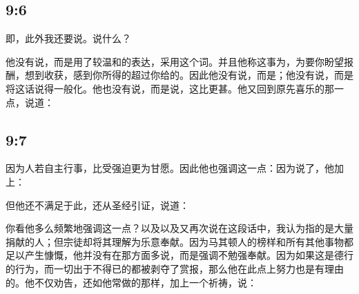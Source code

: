 
\subsection{ 9:6}

即，此外我还要说。说什么？\par

他没有说，而是用了较温和的表达，采用这个词。并且他称这事为，为要你盼望报酬，想到收获，感到你所得的超过你给的。因此他没有说，而是；他没有说，而是将这话说得一般化。他也没有说，而是说，这比更甚。他又回到原先喜乐的那一点，说道：\par


\subsection{ 9:7}

因为人若自主行事，比受强迫更为甘愿。因此他也强调这一点：因为说了，他加上：\par

但他还不满足于此，还从圣经引证，说道：\par

你看他多么频繁地强调这一点？以及以及又再次说在这段话中，我认为指的是大量捐献的人；但宗徒却将其理解为乐意奉献。因为马其顿人的榜样和所有其他事物都足以产生慷慨，他并没有在那方面多说，而是强调不勉强奉献。因为如果这是德行的行为，而一切出于不得已的都被剥夺了赏报，那么他在此点上努力也是有理由的。他不仅劝告，还如他常做的那样，加上一个祈祷，说：\par


\subsection{}


